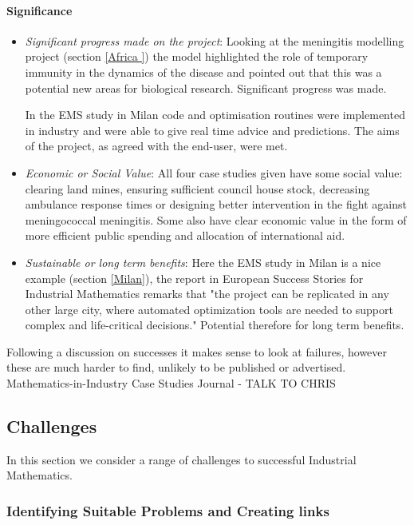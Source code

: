 \documentclass[11pt]{article} %
\begin{document}
\paragraph{Significance}
\begin{itemize}
	\item \textit{Significant progress made on the project}: Looking at the meningitis modelling project (section \ref{Africa }) the model highlighted the role of temporary immunity in the dynamics of the disease and pointed out that this was a   potential new areas for biological research. Significant progress was made. 
	
	In the EMS study in Milan code and optimisation routines were implemented in industry and were able to give real time advice and predictions. The aims of the project, as agreed with the end-user, were met. 
	
	\item \textit{Economic or Social Value}: All four case studies given have some social value: clearing land mines, ensuring sufficient council house stock, decreasing ambulance response times or designing better intervention in the fight against meningococcal meningitis. Some also have clear economic value in the form of more efficient public spending and allocation of international aid.
	\item \textit{Sustainable or long term benefits}: Here the EMS study in Milan is a nice example (section \ref{Milan}), the report in European Success Stories for Industrial Mathematics \cite{European2011}  remarks that "the project can be replicated in any other large city, where automated optimization tools are needed to support complex and life-critical decisions." Potential therefore for long term benefits.
\end{itemize}



	Following a discussion on successes it makes sense to look at failures, however these are much harder to find, unlikely to be published or advertised. Mathematics-in-Industry Case Studies Journal - TALK TO CHRIS 
	
	\subsection{Challenges} 
	In this section we consider a range of challenges to successful Industrial Mathematics. 
	
	\subsubsection{Identifying Suitable Problems and Creating links} 
	
\end{document}

